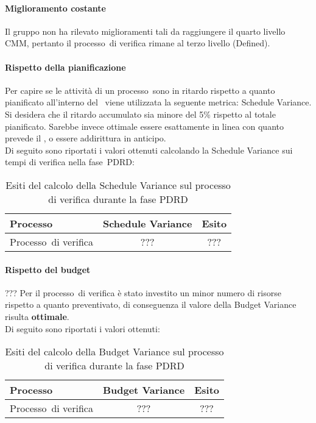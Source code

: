 \documentclass[../PianoDiQualifica.tex]{subfiles}
\begin{document}
\begin{appendices}
			\paragraph{Miglioramento costante}
			Il gruppo non ha rilevato miglioramenti tali da raggiungere il quarto livello CMM\g, pertanto il processo\g\ di verifica rimane al terzo livello (Defined).
			
			\paragraph{Rispetto della pianificazione}
			Per capire se le attività di un processo\g\ sono in ritardo rispetto a quanto pianificato all'interno del \pianodiprogetto\ viene utilizzata la seguente metrica: Schedule Variance.\\
			Si desidera che il ritardo accumulato sia minore del 5\% rispetto al totale pianificato. Sarebbe invece ottimale essere esattamente in linea con quanto prevede il \pianodiprogetto, o essere addirittura in anticipo.\\
			Di seguito sono riportati i valori ottenuti calcolando la Schedule Variance sui tempi di verifica nella fase\g\ PDRD:
			
			\begin{table}[H]
				\centering
				\begin{tabular}{l * {2}{c}}
					\toprule
					\textbf{Processo} & \textbf{Schedule Variance} & \textbf{Esito} \\
					\midrule
					Processo\g\ di verifica & ??? &  ??? \\
					\bottomrule
				\end{tabular}
				\caption{Esiti del calcolo della Schedule Variance sul processo di verifica durante la fase PDRD}
				\label{tab:esiti_schedule_variance}
			\end{table}
			
			\paragraph{Rispetto del budget}
			??? Per il processo\g\ di verifica è stato investito un minor numero di risorse rispetto a quanto preventivato, di conseguenza il valore della Budget Variance risulta \textbf{ottimale}.\\
			Di seguito sono riportati i valori ottenuti:
			\begin{table}[H]
				\centering
				\begin{tabular}{l * {2}{c}}
					\toprule
					\textbf{Processo} & \textbf{Budget Variance} & \textbf{Esito} \\
					\midrule
					Processo\g\ di verifica & ??? &  ??? \\
					\bottomrule
				\end{tabular}
				\caption{Esiti del calcolo della Budget Variance sul processo di verifica durante la fase PDRD}
				\label{tab:esiti_budget_variance}
			\end{table}
	

\end{appendices}
\end{document}
